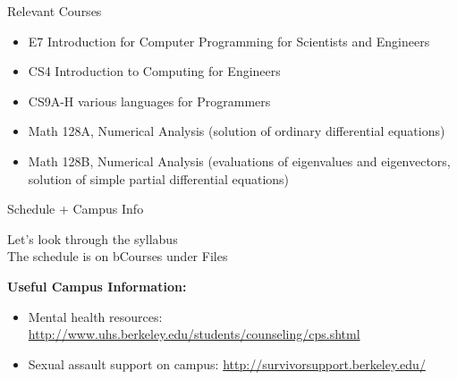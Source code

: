 \documentclass[xcolor=x11names,compress]{beamer}
\renewcommand{\(}{\begin{columns}}
\renewcommand{\)}{\end{columns}}
\newcommand{\<}[1]{\begin{column}{#1}}
\renewcommand{\>}{\end{column}}
\begin{document}

\begin{frame}{Relevant Courses}
\begin{itemize}
\item E7 Introduction for Computer Programming for Scientists and Engineers
\item CS4 Introduction to Computing for Engineers
\item CS9A-H various languages for Programmers
\item Math 128A, Numerical Analysis (solution of ordinary differential equations)
\item Math 128B, Numerical Analysis (evaluations of eigenvalues and eigenvectors, solution of simple partial differential equations)
\end{itemize}
\end{frame}

\begin{frame}{Schedule + Campus Info}

Let's look through the syllabus\\
The schedule is on bCourses under Files
 
\vspace*{2 em}
\textbf{Useful Campus Information:} 
\begin{itemize}
  \item Mental health resources: \href{http://www.uhs.berkeley.edu/students/counseling/cps.shtml}{http://www.uhs.berkeley.edu/students/counseling/cps.shtml}
  \item Sexual assault support on campus: \href{http://survivorsupport.berkeley.edu/}{http://survivorsupport.berkeley.edu/}
\end{itemize}

\end{frame}
\end{document}
